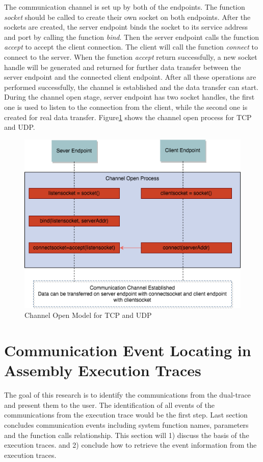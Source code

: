 The communication channel is set up by both of the endpoints. The function \textit{socket} should be called to create their own socket on both endpoints. After the sockets are created, the server endpoint binds the socket to its service address and port by calling the function \textit{bind}. Then the server endpoint calls the function  \textit{accept} to accept the client connection. The client will call the function \textit{connect} to connect to the server. When the function \textit{accept} return successfully, a new socket handle will be generated and returned for further data transfer between the server endpoint and  the connected client endpoint. After all these operations are performed successfully, the channel is established and the data transfer can start. During the channel open stage, server endpoint has two socket handles, the first one is used to listen to the connection from the client, while the second one is created for real data transfer. Figure\ref{channelopen2} shows the channel open process for TCP and UDP.
    
\begin{figure}[H]
\centerline{\includegraphics[scale=0.55]{Figures/tcpudpchannelopen}}
 \caption{Channel Open Model for TCP and UDP}
\label{channelopen2}    
\end{figure}

\section{Communication Event Locating in Assembly Execution Traces}
The goal of this research is to identify the communications from the dual-trace and present them to the user. The identification of all events of the communications from the execution trace would be the first step. Last section concludes communication events including system function names, parameters and the function calls relationship. This section will 1) discuss the basis of the execution traces. and 2) conclude how to retrieve the event information from the execution traces.

